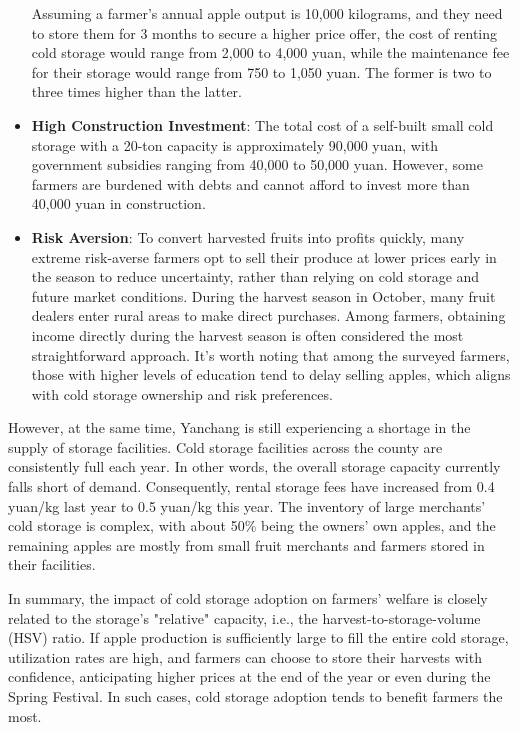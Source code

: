 \begin{itemize}
    Assuming a farmer's annual apple output is 10,000 kilograms, and they need to store them for 3 months to secure a higher price offer, the cost of renting cold storage would range from 2,000 to 4,000 yuan, while the maintenance fee for their storage would range from 750 to 1,050 yuan. The former is two to three times higher than the latter.

    \item \textbf{High Construction Investment}: The total cost of a self-built small cold storage with a 20-ton capacity is approximately 90,000 yuan, with government subsidies ranging from 40,000 to 50,000 yuan. However, some farmers are burdened with debts and cannot afford to invest more than 40,000 yuan in construction.

    \item \textbf{Risk Aversion}: To convert harvested fruits into profits quickly, many extreme risk-averse farmers opt to sell their produce at lower prices early in the season to reduce uncertainty, rather than relying on cold storage and future market conditions. During the harvest season in October, many fruit dealers enter rural areas to make direct purchases. Among farmers, obtaining income directly during the harvest season is often considered the most straightforward approach. It's worth noting that among the surveyed farmers, those with higher levels of education tend to delay selling apples, which aligns with cold storage ownership and risk preferences.
\end{itemize}

However, at the same time, Yanchang is still experiencing a shortage in the supply of storage facilities. Cold storage facilities across the county are consistently full each year. In other words, the overall storage capacity currently falls short of demand. Consequently, rental storage fees have increased from 0.4 yuan/kg last year to 0.5 yuan/kg this year. The inventory of large merchants' cold storage is complex, with about 50\% being the owners' own apples, and the remaining apples are mostly from small fruit merchants and farmers stored in their facilities.

In summary, the impact of cold storage adoption on farmers' welfare is closely related to the storage's "relative" capacity, i.e., the harvest-to-storage-volume (HSV) ratio. If apple production is sufficiently large to fill the entire cold storage, utilization rates are high, and farmers can choose to store their harvests with confidence, anticipating higher prices at the end of the year or even during the Spring Festival. In such cases, cold storage adoption tends to benefit farmers the most.

